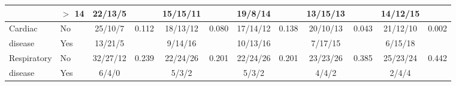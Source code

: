 \begin{sidewaystable}[p]
\begin{tabular}{|l l| c c | c c| c c | c c |c c |}
		                    & $>$ 14    & 22/13/5         &             & 15/15/11     &                & 19/8/14      &                        & 13/15/13     &                   & 14/12/15     &  \\ \hline
		Cardiac             & No        & 25/10/7         & 0.112       & 18/13/12     & 0.080          & 17/14/12     & 0.138                  & 20/10/13     & 0.043             & 21/12/10     & 0.002                \\
		disease             & Yes       & 13/21/5         &             & 9/14/16      &                & 10/13/16     &                        & 7/17/15      &                   & 6/15/18      &  \\ \hline
		Respiratory         & No        & 32/27/12        & 0.239       & 22/24/26     & 0.201          & 22/24/26     & 0.201                  & 23/23/26     & 0.385             & 25/23/24     & 0.442                \\
		disease             & Yes       & 6/4/0           &             & 5/3/2        &                & 5/3/2        &                        & 4/4/2        &                   & 2/4/4        &  \\ \hline
	\end{tabular}
\end{sidewaystable}

		